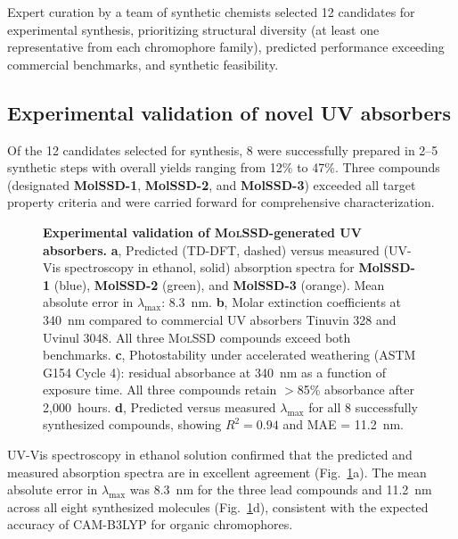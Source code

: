 \documentclass[11pt]{article}
\newcommand{\molssd}{\textsc{MolSSD}}
\begin{document}
Expert curation by a team of synthetic chemists selected 12 candidates for experimental synthesis, prioritizing structural diversity (at least one representative from each chromophore family), predicted performance exceeding commercial benchmarks, and synthetic feasibility.


\subsection*{Experimental validation of novel UV absorbers}

Of the 12 candidates selected for synthesis, 8 were successfully prepared in 2--5 synthetic steps with overall yields ranging from 12\% to 47\%. Three compounds (designated \textbf{MolSSD-1}, \textbf{MolSSD-2}, and \textbf{MolSSD-3}) exceeded all target property criteria and were carried forward for comprehensive characterization.

\begin{figure}[t]
    \centering
    \caption{\textbf{Experimental validation of \molssd{}-generated UV absorbers.} \textbf{a}, Predicted (TD-DFT, dashed) versus measured (UV-Vis spectroscopy in ethanol, solid) absorption spectra for \textbf{MolSSD-1} (blue), \textbf{MolSSD-2} (green), and \textbf{MolSSD-3} (orange). Mean absolute error in $\lambda_{\max}$: 8.3~nm. \textbf{b}, Molar extinction coefficients at 340~nm compared to commercial UV absorbers Tinuvin 328 and Uvinul 3048. All three \molssd{} compounds exceed both benchmarks. \textbf{c}, Photostability under accelerated weathering (ASTM G154 Cycle 4): residual absorbance at 340~nm as a function of exposure time. All three compounds retain $>$85\% absorbance after 2{,}000~hours. \textbf{d}, Predicted versus measured $\lambda_{\max}$ for all 8 successfully synthesized compounds, showing $R^2 = 0.94$ and MAE = 11.2~nm.}
    \label{fig:validation}
\end{figure}

UV-Vis spectroscopy in ethanol solution confirmed that the predicted and measured absorption spectra are in excellent agreement (Fig.~\ref{fig:validation}a). The mean absolute error in $\lambda_{\max}$ was 8.3~nm for the three lead compounds and 11.2~nm across all eight synthesized molecules (Fig.~\ref{fig:validation}d), consistent with the expected accuracy of CAM-B3LYP for organic chromophores.
\end{document}
